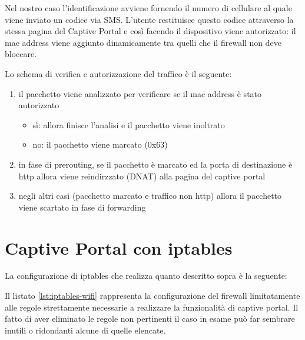 Nel nostro caso l'identificazione avviene fornendo il numero di cellulare al
quale viene inviato un codice via SMS. L'utente restituisce questo codice
attraverso la stessa pagina del Captive Portal e cos\`i facendo il dispositivo
viene autorizzato: il mac address viene aggiunto dinamicamente tra quelli
che il firewall non deve bloccare.

Lo schema di verifica e autorizzazione del traffico è il seguente:
\begin{enumerate}
    \item il pacchetto viene analizzato per verificare se il mac
    address è stato autorizzato
    \begin{itemize}
        \item sì: allora finisce l'analisi e il pacchetto viene inoltrato
        \item no: il pacchetto viene marcato (0x63)
    \end{itemize}
    \item in fase di prerouting, se il pacchetto è marcato ed la porta di
    destinazione è http allora viene reindirzzato (DNAT) alla pagina del
    captive portal
    \item negli altri casi (pacchetto marcato e traffico non http) allora il
    pacchetto viene scartato in fase di forwarding
\end{enumerate}

\section{Captive Portal con iptables}
La configurazione di iptables che realizza quanto descritto sopra è la
seguente:

Il listato \ref{lst:iptables-wifi} rappresenta la configurazione del
firewall limitatamente alle regole strettamente necessarie a realizzare la
funzionalità di captive portal. Il fatto di aver eliminato le regole non
pertinenti il caso in esame può far sembrare inutili o ridondanti alcune di
quelle elencate.

